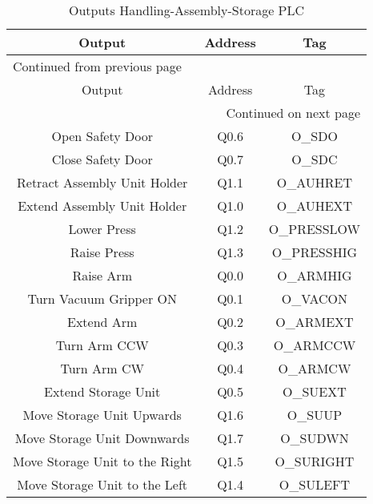 \begin{longtable}{c|c|c}
\caption{Outputs Handling-Assembly-Storage PLC} \label{tab:plcHandlingOutput}
\\
Output & Address & Tag\\
\hline
\endfirsthead
\multicolumn{3}{l}{Continued from previous page} \\
\hline

Output & Address & Tag \\

\hline
\endhead
\hline\multicolumn{3}{r}{Continued on next page} \\
\endfoot
\endlastfoot
\hline
Open Safety Door & Q0.6 & O\_SDO      \\
Close Safety Door & Q0.7 & O\_SDC      \\
Retract Assembly Unit Holder & Q1.1 & O\_AUHRET   \\
Extend Assembly Unit Holder & Q1.0 & O\_AUHEXT   \\
Lower Press & Q1.2 & O\_PRESSLOW \\
Raise Press & Q1.3 & O\_PRESSHIG \\
Raise Arm & Q0.0 & O\_ARMHIG   \\
Turn Vacuum Gripper ON & Q0.1 & O\_VACON    \\
Extend Arm & Q0.2 & O\_ARMEXT   \\
Turn Arm CCW & Q0.3 & O\_ARMCCW   \\
Turn Arm CW & Q0.4 & O\_ARMCW    \\
Extend Storage Unit & Q0.5 & O\_SUEXT    \\
Move Storage Unit Upwards & Q1.6 & O\_SUUP     \\
Move Storage Unit Downwards & Q1.7 & O\_SUDWN    \\
Move Storage Unit to the Right & Q1.5 & O\_SURIGHT  \\
Move Storage Unit to the Left & Q1.4 & O\_SULEFT   \\
\end{longtable}
